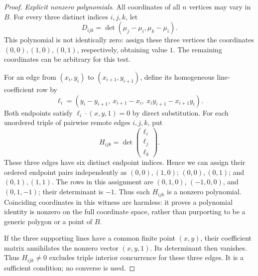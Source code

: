 \begin{proof}
\emph{Explicit nonzero polynomials.}
All coordinates of all $n$ vertices may vary in $B$.
For every three distinct indices $i,j,k$, let
\begin{equation}\label{fibpr:triple}
D_{ijk}=\det(\mu_j-\mu_i,\mu_k-\mu_i).
\end{equation}
This polynomial is not identically zero: assign these three vertices
the coordinates $(0,0),(1,0),(0,1)$, respectively, obtaining value $1$.
The remaining coordinates can be arbitrary for this test.

For an edge from $(x_i,y_i)$ to $(x_{i+1},y_{i+1})$, define its
homogeneous line-coefficient row by
\begin{equation}\label{fibpr:line}
\ell_i=(y_i-y_{i+1},\ x_{i+1}-x_i,\
               x_i y_{i+1}-x_{i+1}y_i).
\end{equation}
Both endpoints satisfy $\ell_i\cdot(x,y,1)=0$ by direct substitution.
For each unordered triple of pairwise remote edges $i,j,k$, put
\begin{equation}\label{fibpr:concurrence}
H_{ijk}=\det\begin{pmatrix}\ell_i\\\ell_j\\\ell_k\end{pmatrix}.
\end{equation}
These three edges have six distinct endpoint indices. Hence we can
assign their ordered endpoint pairs independently as
$(0,0),(1,0)$; $(0,0),(0,1)$; and $(0,1),(1,1)$.
The rows in this assignment are $(0,1,0)$, $(-1,0,0)$, and $(0,1,-1)$;
their determinant is $-1$. Thus each $H_{ijk}$ is a nonzero polynomial.
Coinciding coordinates in this witness are harmless: it proves a
polynomial identity is nonzero on the full coordinate space, rather
than purporting to be a generic polygon or a point of $B$.

If the three supporting lines have a common finite point $(x,y)$,
their coefficient matrix annihilates the nonzero vector $(x,y,1)$.
Its determinant then vanishes. Thus $H_{ijk}\ne0$ excludes triple
interior concurrence for these three edges. It is a sufficient
condition; no converse is used.


\end{proof}
